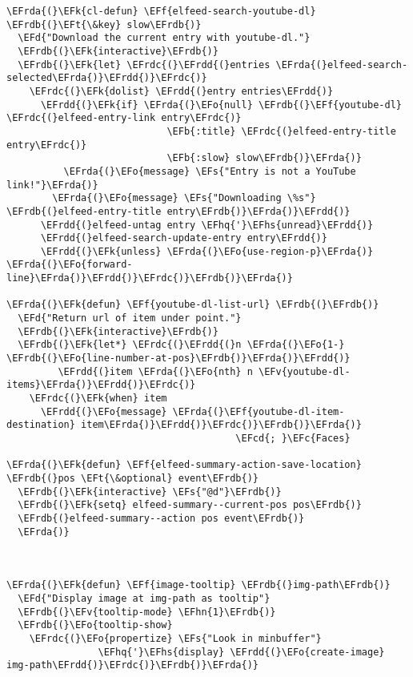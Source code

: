 \documentclass[a4wide,10pt]{article}
\newcommand{\EFc}[1]{\textcolor{EFc}{#1}} %
\newcommand{\EFcd}[1]{\textcolor{EFcd}{#1}} %
\newcommand{\EFs}[1]{\textcolor{EFs}{#1}} %
\newcommand{\EFd}[1]{\textcolor{EFd}{#1}} %
\newcommand{\EFk}[1]{\textcolor{EFk}{#1}} %
\newcommand{\EFb}[1]{\textcolor{EFb}{#1}} %
\newcommand{\EFf}[1]{\textcolor{EFf}{#1}} %
\newcommand{\EFv}[1]{\textcolor{EFv}{#1}} %
\newcommand{\EFt}[1]{\textcolor{EFt}{#1}} %
\newcommand{\EFo}[1]{\textcolor{EFo}{#1}} %
\newcommand{\EFhn}[1]{\textcolor{EFhn}{\textbf{#1}}} %
\newcommand{\EFhq}[1]{\textcolor{EFhq}{#1}} %
\newcommand{\EFhs}[1]{\textcolor{EFhs}{#1}} %
\newcommand{\EFrda}[1]{\textcolor{EFrda}{#1}} %
\newcommand{\EFrdb}[1]{\textcolor{EFrdb}{#1}} %
\newcommand{\EFrdc}[1]{\textcolor{EFrdc}{#1}} %
\newcommand{\EFrdd}[1]{\textcolor{EFrdd}{#1}} %
\begin{document}
\begin{Code}
\begin{Verbatim}
\EFrda{(}\EFk{cl-defun} \EFf{elfeed-search-youtube-dl} \EFrdb{(}\EFt{\&key} slow\EFrdb{)}
  \EFd{"Download the current entry with youtube-dl."}
  \EFrdb{(}\EFk{interactive}\EFrdb{)}
  \EFrdb{(}\EFk{let} \EFrdc{(}\EFrdd{(}entries \EFrda{(}elfeed-search-selected\EFrda{)}\EFrdd{)}\EFrdc{)}
    \EFrdc{(}\EFk{dolist} \EFrdd{(}entry entries\EFrdd{)}
      \EFrdd{(}\EFk{if} \EFrda{(}\EFo{null} \EFrdb{(}\EFf{youtube-dl} \EFrdc{(}elfeed-entry-link entry\EFrdc{)}
                            \EFb{:title} \EFrdc{(}elfeed-entry-title entry\EFrdc{)}
                            \EFb{:slow} slow\EFrdb{)}\EFrda{)}
          \EFrda{(}\EFo{message} \EFs{"Entry is not a YouTube link!"}\EFrda{)}
        \EFrda{(}\EFo{message} \EFs{"Downloading \%s"} \EFrdb{(}elfeed-entry-title entry\EFrdb{)}\EFrda{)}\EFrdd{)}
      \EFrdd{(}elfeed-untag entry \EFhq{'}\EFhs{unread}\EFrdd{)}
      \EFrdd{(}elfeed-search-update-entry entry\EFrdd{)}
      \EFrdd{(}\EFk{unless} \EFrda{(}\EFo{use-region-p}\EFrda{)} \EFrda{(}\EFo{forward-line}\EFrda{)}\EFrdd{)}\EFrdc{)}\EFrdb{)}\EFrda{)}

\EFrda{(}\EFk{defun} \EFf{youtube-dl-list-url} \EFrdb{(}\EFrdb{)}
  \EFd{"Return url of item under point."}
  \EFrdb{(}\EFk{interactive}\EFrdb{)}
  \EFrdb{(}\EFk{let*} \EFrdc{(}\EFrdd{(}n \EFrda{(}\EFo{1-} \EFrdb{(}\EFo{line-number-at-pos}\EFrdb{)}\EFrda{)}\EFrdd{)}
         \EFrdd{(}item \EFrda{(}\EFo{nth} n \EFv{youtube-dl-items}\EFrda{)}\EFrdd{)}\EFrdc{)}
    \EFrdc{(}\EFk{when} item
      \EFrdd{(}\EFo{message} \EFrda{(}\EFf{youtube-dl-item-destination} item\EFrda{)}\EFrdd{)}\EFrdc{)}\EFrdb{)}\EFrda{)}
                                        \EFcd{; }\EFc{Faces}

\EFrda{(}\EFk{defun} \EFf{elfeed-summary-action-save-location} \EFrdb{(}pos \EFt{\&optional} event\EFrdb{)}
  \EFrdb{(}\EFk{interactive} \EFs{"@d"}\EFrdb{)}
  \EFrdb{(}\EFk{setq} elfeed-summary--current-pos pos\EFrdb{)}
  \EFrdb{(}elfeed-summary--action pos event\EFrdb{)}
  \EFrda{)}



\EFrda{(}\EFk{defun} \EFf{image-tooltip} \EFrdb{(}img-path\EFrdb{)}
  \EFd{"Display image at img-path as tooltip"}
  \EFrdb{(}\EFv{tooltip-mode} \EFhn{1}\EFrdb{)}
  \EFrdb{(}\EFo{tooltip-show}
    \EFrdc{(}\EFo{propertize} \EFs{"Look in minbuffer"}
                \EFhq{'}\EFhs{display} \EFrdd{(}\EFo{create-image} img-path\EFrdd{)}\EFrdc{)}\EFrdb{)}\EFrda{)}


\end{Verbatim}
\end{Code}
\end{document}
